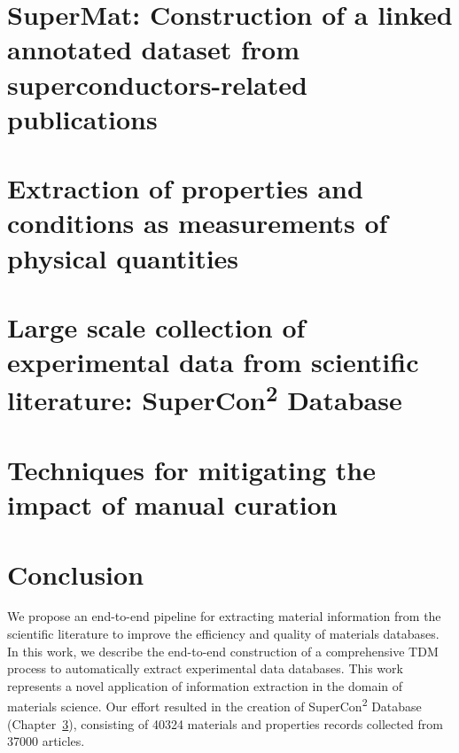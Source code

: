 \documentclass[a4paper,11pt]{report}
\begin{document}
\chapter{SuperMat: Construction of a linked annotated dataset from superconductors-related publications}
\label{cha:supermat}


\chapter{Extraction of properties and conditions as measurements of physical quantities}
\label{cha:measurements}


\chapter{Large scale collection of experimental data from scientific literature: SuperCon\texorpdfstring{\textsuperscript{2}}{2} Database}
\label{cha:supercon2}


\chapter{Techniques for mitigating the impact of manual curation}
\label{cha:curation}


\chapter{Conclusion}
We propose an end-to-end pipeline for extracting material information from the scientific literature to improve the efficiency and quality of materials databases.
In this work, we describe the end-to-end construction of a comprehensive TDM process to automatically extract experimental data databases. 
This work represents a novel application of information extraction in the domain of materials science. 
Our effort resulted in the creation of SuperCon\textsuperscript{2} Database (Chapter~\ref{cha:supercon2}), consisting of 40324 materials and properties records collected from 37000 articles.
\end{document}
